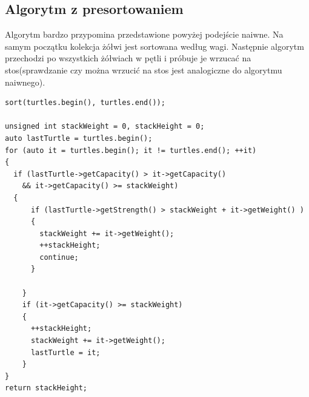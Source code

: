 \documentclass[11pt,a4paper]{article}
\begin{document}
\subsection{Algorytm z presortowaniem}
Algorytm bardzo przypomina przedstawione powyżej podejście naiwne. Na samym początku kolekcja żółwi jest sortowana według wagi. Następnie algorytm przechodzi po wszystkich żółwiach w pętli i próbuje je wrzucać na stos(sprawdzanie czy można wrzucić na stos jest analogiczne do algorytmu naiwnego).

\begin{lstlisting}
sort(turtles.begin(), turtles.end());

unsigned int stackWeight = 0, stackHeight = 0;
auto lastTurtle = turtles.begin();
for (auto it = turtles.begin(); it != turtles.end(); ++it)
{
  if (lastTurtle->getCapacity() > it->getCapacity() 
    && it->getCapacity() >= stackWeight)
  {
      if (lastTurtle->getStrength() > stackWeight + it->getWeight() )
      {
        stackWeight += it->getWeight();
        ++stackHeight;
        continue;
      }
			
    }
    if (it->getCapacity() >= stackWeight)
    {
      ++stackHeight;
      stackWeight += it->getWeight();
      lastTurtle = it;
    }
}
return stackHeight;
\end{lstlisting}
\end{document}
